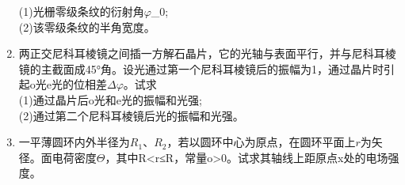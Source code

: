 \begin{enumerate}
(1)光栅零级条纹的衍射角$\varphi$_0;\\
(2)该零级条纹的半角宽度。
\item 两正交尼科耳棱镜之间插一方解石晶片，它的光轴与表面平行，并与尼科耳棱镜的主截面成45°角。设光通过第一个尼科耳棱镜后的振幅为1，通过晶片时引起o光e光的位相差$\Delta \varphi$。试求\\
(1)通过晶片后o光和e光的振幅和光强;\\
(2)通过第二个尼科耳棱镜后光的振幅和光强。
\item 一平薄圆环内外半径为$R_1$、$R_2$，若以圆环中心为原点，在圆环平面上$r$为矢径。面电荷密度$\Theta$，其中R<r≤R，常量o>0。试求其轴线上距原点x处的电场强度。
\end{enumerate}